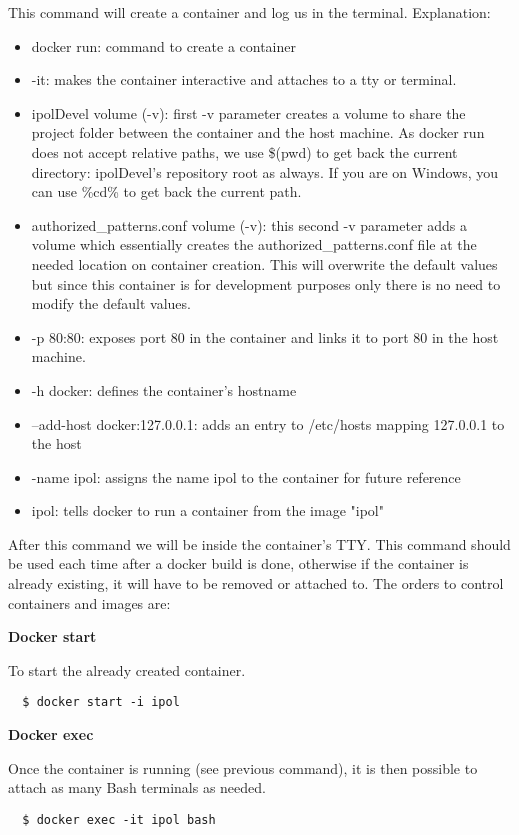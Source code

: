 \documentclass[a4paper,12pt]{article}
\begin{document}
This command will create a container and log us in the terminal. Explanation:
\begin{itemize}
  \item docker run: command to create a container
  \item -it: makes the container interactive and attaches to a tty or terminal.
  \item ipolDevel volume (-v): first -v parameter creates a volume to share the project folder between the container and the host machine.
  As docker run does not accept relative paths, we use \$(pwd) to get back the current directory: ipolDevel's repository root as always. If you are on
  Windows, you can use \%cd\% to get back the current path. 
  \item authorized\_patterns.conf volume (-v): this second -v parameter adds a volume which essentially creates the authorized\_patterns.conf file at the 
  needed location on container creation. 
  This will overwrite the default values but since this container is for development purposes only there is no need to modify the default values.
  \item -p 80:80: exposes port 80 in the container and links it to port 80 in the host machine.
  \item -h docker: defines the container's hostname
  \item --add-host docker:127.0.0.1: adds an entry to /etc/hosts mapping 127.0.0.1 to the host
  \item -name ipol: assigns the name ipol to the container for future reference
  \item ipol: tells docker to run a container from the image "ipol"
\end{itemize}

After this command we will be inside the container's TTY. This command should be used each time after a docker build is done,
otherwise if the container is already existing, it will have to be removed or attached to. The orders to control containers and images are:

\textbf{Docker start}

To start the already created container.
\begin{verbatim}
  $ docker start -i ipol
\end{verbatim}

\textbf{Docker exec}

Once the container is running (see previous command), it is then possible to attach as many Bash terminals as needed.
\begin{verbatim}
  $ docker exec -it ipol bash
\end{verbatim}
\end{document}
